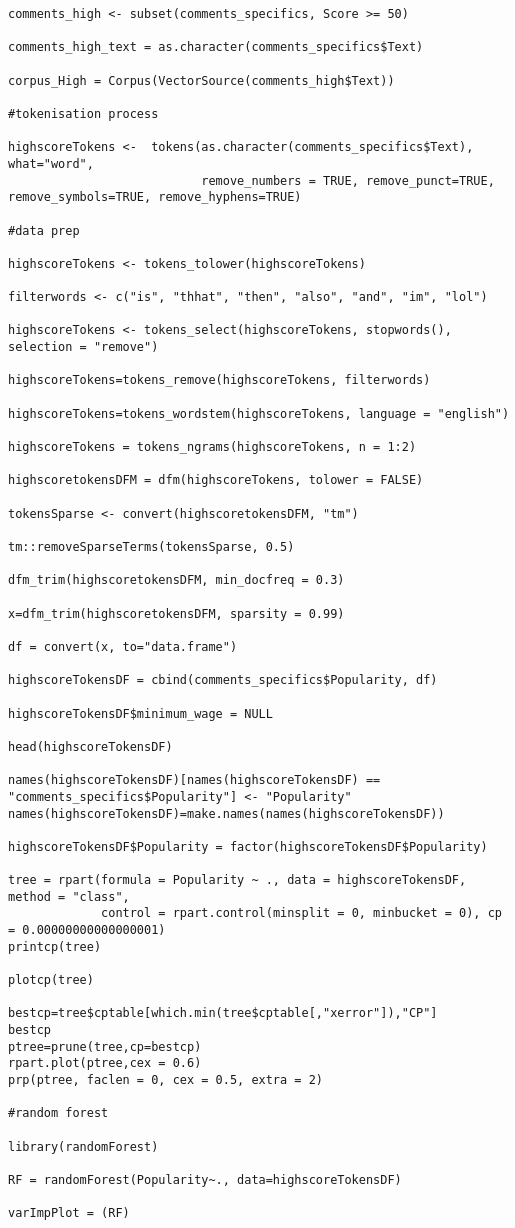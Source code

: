 \begin{lstlisting}
comments_high <- subset(comments_specifics, Score >= 50)

comments_high_text = as.character(comments_specifics$Text)

corpus_High = Corpus(VectorSource(comments_high$Text))

#tokenisation process

highscoreTokens <-  tokens(as.character(comments_specifics$Text), what="word",
                           remove_numbers = TRUE, remove_punct=TRUE, remove_symbols=TRUE, remove_hyphens=TRUE)

#data prep

highscoreTokens <- tokens_tolower(highscoreTokens)

filterwords <- c("is", "thhat", "then", "also", "and", "im", "lol")

highscoreTokens <- tokens_select(highscoreTokens, stopwords(), selection = "remove")

highscoreTokens=tokens_remove(highscoreTokens, filterwords)

highscoreTokens=tokens_wordstem(highscoreTokens, language = "english")

highscoreTokens = tokens_ngrams(highscoreTokens, n = 1:2)

highscoretokensDFM = dfm(highscoreTokens, tolower = FALSE)

tokensSparse <- convert(highscoretokensDFM, "tm")

tm::removeSparseTerms(tokensSparse, 0.5)

dfm_trim(highscoretokensDFM, min_docfreq = 0.3)

x=dfm_trim(highscoretokensDFM, sparsity = 0.99)

df = convert(x, to="data.frame")

highscoreTokensDF = cbind(comments_specifics$Popularity, df)

highscoreTokensDF$minimum_wage = NULL

head(highscoreTokensDF)

names(highscoreTokensDF)[names(highscoreTokensDF) == "comments_specifics$Popularity"] <- "Popularity"
names(highscoreTokensDF)=make.names(names(highscoreTokensDF))

highscoreTokensDF$Popularity = factor(highscoreTokensDF$Popularity)

tree = rpart(formula = Popularity ~ ., data = highscoreTokensDF, method = "class",
             control = rpart.control(minsplit = 0, minbucket = 0), cp = 0.00000000000000001)
printcp(tree)

plotcp(tree)

bestcp=tree$cptable[which.min(tree$cptable[,"xerror"]),"CP"]
bestcp
ptree=prune(tree,cp=bestcp)
rpart.plot(ptree,cex = 0.6)
prp(ptree, faclen = 0, cex = 0.5, extra = 2)

#random forest

library(randomForest)

RF = randomForest(Popularity~., data=highscoreTokensDF)

varImpPlot = (RF)


\end{lstlisting}

